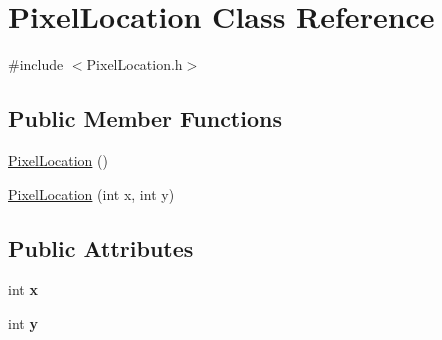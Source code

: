 \hypertarget{class_pixel_location}{}\section{Pixel\+Location Class Reference}
\label{class_pixel_location}


{\ttfamily \#include $<$Pixel\+Location.\+h$>$}

\subsection*{Public Member Functions}
\begin{DoxyCompactItemize}
\item 
\hyperlink{class_pixel_location_acddc215e41c58ee73035c82b56c4c44c}{Pixel\+Location} ()
\item 
\hyperlink{class_pixel_location_a4229aa113847e419bb8427bfb37a55cf}{Pixel\+Location} (int x, int y)
\end{DoxyCompactItemize}
\subsection*{Public Attributes}
\begin{DoxyCompactItemize}
\item 
\mbox{\label{class_pixel_location_ad237ab10b1aa7248dc29b57e45c0de93}} 
int {\bfseries x}
\item 
\mbox{\label{class_pixel_location_a4dbe2d4b3ee1402f0d06e4d7e577fbd4}} 
int {\bfseries y}
\end{DoxyCompactItemize}
